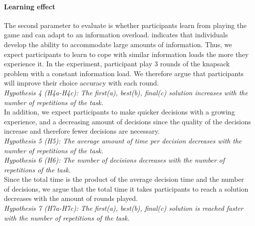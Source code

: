\paragraph{Learning effect}
The second parameter to evaluate is whether participants learn from playing the game and can adapt to an information overload. \cite{Jacoby1974} indicates that individuals develop the ability to accommodate large amounts of information. Thus, we expect participants to learn to cope with similar information loads the more they experience it. In the experiment, participant play 3 rounds of the knapsack problem with a constant information load. We therefore argue that participants will improve their choice accuracy with each round.\\
\textit{Hypothesis 4 (H4a-H4c): The first(a), best(b), final(c) solution increases with the number of repetitions of the task. }\\
In addition, we expect participants to make quicker decisions with a growing experience, and a decreasing amount of decisions since the quality of the decisions increase and therefore fewer decisions are necessary. \\
\textit{Hypothesis 5 (H5): The average amount of time per decision decreases with the number of repetitions of the task. }\\
\textit{Hypothesis 6 (H6): The number of decisions decreases with the number of repetitions of the task. }\\
Since the total time is the product of the average decision time and the number of decisions, we argue that the total time it takes participants to reach a solution decreases with the amount of rounds played.\\
\textit{Hypothesis 7 (H7a-H7c): The first(a), best(b), final(c) solution is reached faster with the number of repetitions of the task. }

